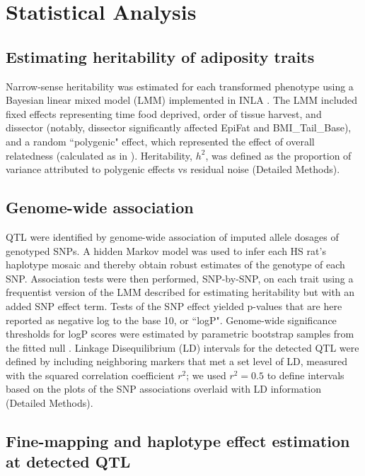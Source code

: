 \section{Statistical Analysis}

\subsection{Estimating heritability of adiposity traits}

Narrow-sense heritability was estimated for each transformed phenotype using a Bayesian linear mixed model (LMM) implemented in INLA \citep{Holand2013a, Rue2009a}. The LMM included fixed effects representing time food deprived, order of tissue harvest, and dissector (notably, dissector significantly affected EpiFat and BMI\_Tail\_Base), and a random ``polygenic" effect, which represented the effect of overall relatedness (calculated as in \cite{Gatti2014}). Heritability, $h^2$, was defined as the proportion of variance attributed to polygenic effects vs residual noise (Detailed Methods).

\subsection{Genome-wide association}

QTL were identified by genome-wide association of imputed allele dosages of genotyped SNPs. A hidden Markov model \citep{Broman2016} was used to infer each HS rat's haplotype mosaic and thereby obtain robust estimates of the genotype of each SNP. Association tests were then performed, SNP-by-SNP, on each trait using a frequentist version of the LMM described for estimating heritability but with an added SNP effect term. Tests of the SNP effect yielded p-values that are here reported as negative log to the base 10, or ``logP". Genome-wide significance thresholds for logP scores were estimated by parametric bootstrap samples from the fitted null \citep{SolbergWoods2010, Valdar2009}.  Linkage Disequilibrium (LD) intervals for the detected QTL were defined by including neighboring markers that met a set level of LD, measured with the squared correlation coefficient $r^{2}$; we used $r^{2}=0.5$ to define intervals based on the plots of the SNP associations overlaid with LD information (Detailed Methods).

\subsection{Fine-mapping and haplotype effect estimation at detected QTL}

